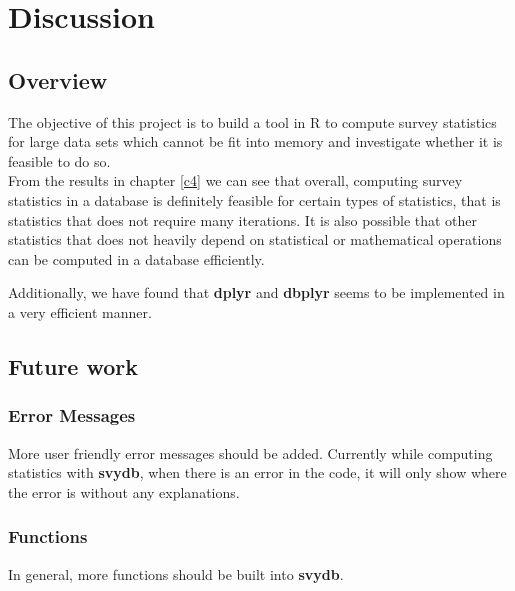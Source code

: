 
\chapter{Discussion} \label{c6}

\section{Overview}
The objective of this project is to build a tool in {\sf R} to compute survey statistics for large data sets which cannot be fit into memory and investigate whether it is feasible to do so.\\

From the results in chapter \ref{c4} we can see that overall, computing survey statistics in a database is definitely feasible for certain types of statistics, that is statistics that does not require many iterations. It is also possible that other statistics that does not heavily depend on statistical or mathematical operations can be computed in a database efficiently.

Additionally, we have found that {\bf dplyr} and {\bf dbplyr} seems to be implemented in a very efficient manner.


\section{Future work}
\subsection{Error Messages}
More user friendly error messages should be added. Currently while computing statistics with {\bf svydb}, when there is an error in the code, it will only show where the error is without any explanations.

\subsection{Functions}
In general, more functions should be built into {\bf svydb}.
